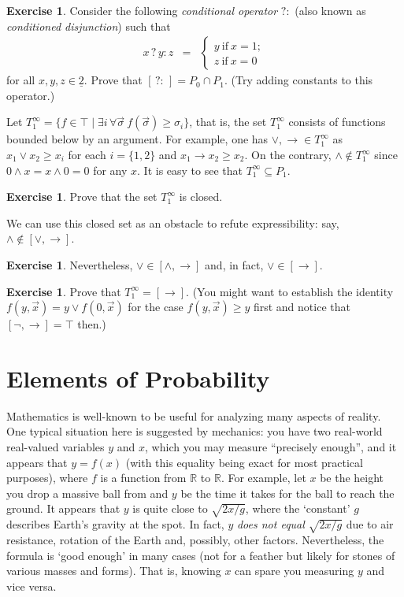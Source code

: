 \documentclass[12pt,notitlepage]{article}
\theoremstyle{plain}
\theoremstyle{definition}
\newtheorem{exc}[thm]{Exercise}
\theoremstyle{plain}
\newcommand{\R}{\mathbb{R}}
\newcommand{\sbs}{\subseteq}
\newcommand{\ul}[1]{\underline{#1}}
\newcommand{\1}{\mathbf{1}}
\newcommand{\0}{\mathbf{0}}
\begin{document}
\begin{exc} Consider the following \emph{conditional operator} ${?}{:}$ (also known as \emph{conditioned disjunction}) such that 
$$\begin{array}{rcl}
x\mathrel{?}y\mathrel{:}z &=& \begin{cases}
	    y\ \mbox{if}\ x = 1;\\
	    z\ \mbox{if}\ x = 0
          \end{cases}
\end{array}$$
for all $x,y,z \in \ul{2}$.
Prove that  $[\,{?}{:}\,] = P_0 \cap P_1$. (Try adding constants to this operator.)
\end{exc}

Let $T^\infty_1 = \{ f\in \top \mid \exists i\, \forall \vec \sigma\ f(\vec \sigma) \geq \sigma_i \}$, that is, the set $T^\infty_1$ consists of functions bounded below by an argument. For example, one has ${\vee}, {\to} \in T^\infty_1$ as $x_1 \vee x_2 \geq x_i$ for each $i = \{1, 2\}$ and $x_1 \to x_2 \geq x_2$. On the contrary, ${\wedge} \notin T^\infty_1$ since $0 \wedge x = x \wedge 0 = 0$ for any $x$. It is easy to see that $T^\infty_1 \sbs P_1$.

\begin{exc}
Prove that the set $T^\infty_1$ is closed.
\end{exc}

\noindent We can use this closed set as an obstacle to refute expressibility: say, $\wedge \notin [{\vee}, {\to}]$.
\begin{exc}
Nevertheless, $\vee \in [{\wedge}, {\to}]$ and, in fact, $\vee \in [{\to}]$.
\end{exc}
\begin{exc}
Prove that $T^\infty_1 = [\to]$. (You might want to establish the identity $f(y, \vec x) = y \vee f(0, \vec x)$ for the case $f(y,\vec x) \geq y$ first and notice that $[{\neg}, {\to}] = \top$ then.)
\end{exc}

\section{Elements of Probability}

Mathematics is well-known to be useful for analyzing many aspects of reality. One typical situation here is suggested by mechanics: you have two real-world real-valued variables $y$ and $x$, which you may measure ``precisely enough'', and it appears that $y = f(x)$ (with this equality being exact for most practical purposes), where $f$ is a function from $\R$ to $\R$. For example, let $x$ be the height you drop a massive ball from and $y$ be the time it takes for the ball to reach the ground. It appears that $y$ is quite close to $\sqrt{2x/g}$, where the `constant' $g$ describes Earth's gravity at the spot. In fact, $y$ \emph{does not equal} $\sqrt{2x/g}$ due to air resistance, rotation of the Earth and, possibly, other factors. Nevertheless, the formula is `good enough' in many cases (not for a feather but likely for stones of various masses and forms). That is, knowing $x$ can spare you measuring $y$ and vice versa.
\end{document}
